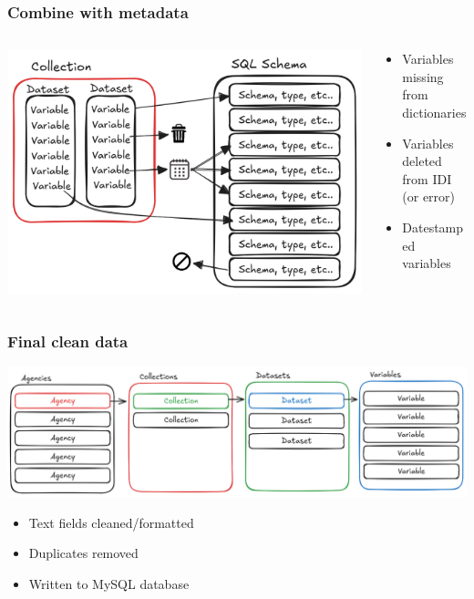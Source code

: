 \documentclass[aspectratio=169]{beamer}
\begin{document}
\begin{frame}
    \frametitle{Combine with metadata}

    \begin{columns}
        \begin{column}{0.5\textwidth}
            \begin{center}
                \includegraphics[width=0.8\linewidth]{dd-merge.png}
            \end{center}
        \end{column}
        \begin{column}{0.5\textwidth}
            \begin{itemize}
                \item Variables missing from dictionaries
                \item Variables deleted from IDI (or error)
                \item Datestamped variables
            \end{itemize}
        \end{column}
    \end{columns}

\end{frame}

\begin{frame}
    \frametitle{Final clean data}

    \begin{center}
        \includegraphics[width=0.7\linewidth]{dd-result.png}
    \end{center}

    \begin{itemize}
        \item Text fields cleaned/formatted
        \item Duplicates removed
        \item Written to MySQL database
    \end{itemize}

\end{frame}
\end{document}
